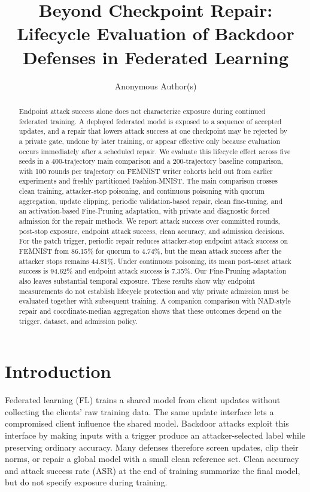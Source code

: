 \documentclass[sigconf,review,anonymous]{acmart}
\title{Beyond Checkpoint Repair: Lifecycle Evaluation of Backdoor Defenses in Federated Learning}
\author{Anonymous Author(s)}
\begin{document}
\begin{abstract}
Endpoint attack success alone does not characterize exposure during continued federated training. A deployed federated model is exposed to a sequence of accepted updates, and a repair that lowers attack success at one checkpoint may be rejected by a private gate, undone by later training, or appear effective only because evaluation occurs immediately after a scheduled repair. We evaluate this lifecycle effect across five seeds in a 400-trajectory main comparison and a 200-trajectory baseline comparison, with 100 rounds per trajectory on FEMNIST writer cohorts held out from earlier experiments and freshly partitioned Fashion-MNIST. The main comparison crosses clean training, attacker-stop poisoning, and continuous poisoning with quorum aggregation, update clipping, periodic validation-based repair, clean fine-tuning, and an activation-based Fine-Pruning adaptation, with private and diagnostic forced admission for the repair methods. We report attack success over committed rounds, post-stop exposure, endpoint attack success, clean accuracy, and admission decisions. For the patch trigger, periodic repair reduces attacker-stop endpoint attack success on FEMNIST from 86.15\% for quorum to 4.74\%, but the mean attack success after the attacker stops remains 44.81\%. Under continuous poisoning, its mean post-onset attack success is 94.62\% and endpoint attack success is 7.35\%. Our Fine-Pruning adaptation also leaves substantial temporal exposure. These results show why endpoint measurements do not establish lifecycle protection and why private admission must be evaluated together with subsequent training. A companion comparison with NAD-style repair and coordinate-median aggregation shows that these outcomes depend on the trigger, dataset, and admission policy.\end{abstract}
\maketitle
\fancyhead[LE,RO]{}

\section{Introduction}
Federated learning (FL) trains a shared model from client updates without collecting the clients' raw training data. The same update interface lets a compromised client influence the shared model. Backdoor attacks exploit this interface by making inputs with a trigger produce an attacker-selected label while preserving ordinary accuracy. Many defenses therefore screen updates, clip their norms, or repair a global model with a small clean reference set. Clean accuracy and attack success rate (ASR) at the end of training summarize the final model, but do not specify exposure during training.
\end{document}
